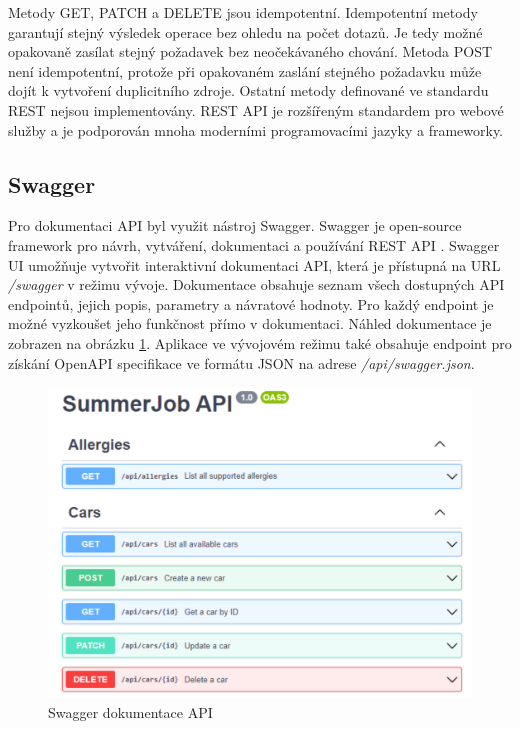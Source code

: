 Metody GET, PATCH a DELETE jsou idempotentní. Idempotentní metody garantují stejný výsledek operace bez ohledu na počet dotazů. Je tedy možné opakovaně
zasílat stejný požadavek bez neočekávaného chování. Metoda POST není idempotentní, protože při opakovaném zaslání stejného požadavku může dojít k vytvoření duplicitního zdroje. 
Ostatní metody definované ve standardu REST nejsou implementovány. REST API je rozšířeným standardem pro webové služby a je podporován mnoha moderními programovacími jazyky a frameworky.

\subsection{Swagger}

Pro dokumentaci API byl využit nástroj Swagger. Swagger je open-source framework pro návrh, vytváření, dokumentaci a používání REST API \cite{swagger_ui}.
Swagger UI umožňuje vytvořit interaktivní dokumentaci API, která je přístupná na URL \textit{/swagger} v režimu vývoje. Dokumentace obsahuje seznam všech dostupných
API endpointů, jejich popis, parametry a návratové hodnoty. Pro každý endpoint je možné vyzkoušet jeho funkčnost přímo v dokumentaci.
Náhled dokumentace je zobrazen na obrázku \ref{fig:swagger}.
Aplikace ve vývojovém režimu také obsahuje endpoint pro získání OpenAPI specifikace \cite{openapi} ve formátu JSON na adrese \textit{/api/swagger.json}.

\begin{figure}[h]
    \centering
    \includegraphics[width=1\textwidth]{chapters/images/swagger.pdf}
    \caption{Swagger dokumentace API}
    \label{fig:swagger}
\end{figure}


